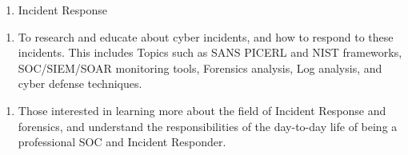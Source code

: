 

\begin{enumerate}
	\item Incident Response
\end{enumerate}


\begin{enumerate}
	\item To research and educate about cyber incidents, and how to respond to these incidents. This includes Topics such as SANS PICERL and NIST frameworks, SOC/SIEM/SOAR monitoring tools, Forensics analysis, Log analysis, and cyber defense techniques.
\end{enumerate}


\begin{enumerate}
	\item Those interested in learning more about the field of Incident Response and forensics, and understand the responsibilities of the day-to-day life of being a professional SOC and Incident Responder.
\end{enumerate}